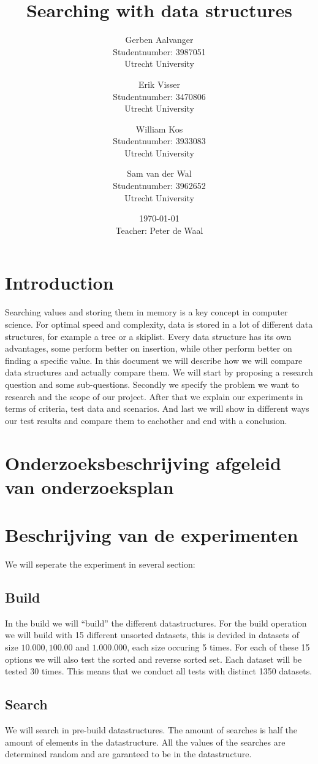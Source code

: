 \documentclass{article}
\title{Searching with data structures}
\author{
		Gerben Aalvanger\\ 
	        	Studentnumber: 3987051 \\
	        	Utrecht University
			\and
		Erik Visser\\
	        	Studentnumber: 3470806 \\
	        	Utrecht University
	        	\and
	        	William Kos\\
	        	Studentnumber: 3933083\\
	        	Utrecht University\\
	        	\and
	        	Sam van der Wal\\
	        	Studentnumber: 3962652\\
	        	Utrecht University}
\date{\today \\Teacher: Peter de Waal}
\begin{document}
\maketitle
\section{Introduction}
Searching values and storing them in memory is a key concept in computer science. For optimal speed and complexity, data is stored in a lot of different data structures, for example a tree or a skiplist. Every data structure has its own advantages, some perform better on insertion, while other perform better on finding a specific value. In this document we will describe how we will compare data structures and actually compare them. We will start by proposing a research question and some sub-questions. Secondly we specify the problem we want to research and the scope of our project. After that we explain our experiments in terms of criteria, test data and scenarios. And last we will show in different ways our test results and compare them to eachother and end with a conclusion. 

\section{Onderzoeksbeschrijving afgeleid van onderzoeksplan}
\section{Beschrijving van de experimenten}
We will seperate the experiment in several section:
\subsection{Build}
In the build we will ``build'' the different datastructures. 
For the build operation we will build with 15 different unsorted datasets, this is devided in datasets of size $10.000, 100.00$ and $1.000.000$, each size occuring 5 times.  For each of these 15 options we will also test the sorted and reverse sorted set. Each dataset will be tested 30 times. This means that we conduct all tests with distinct 1350 datasets.
\subsection{Search}
We will search in pre-build datastructures. The amount of searches is half the amount of elements in the datastructure. All the values of the searches are determined random and are garanteed to be in the datastructure. 
\end{document}
